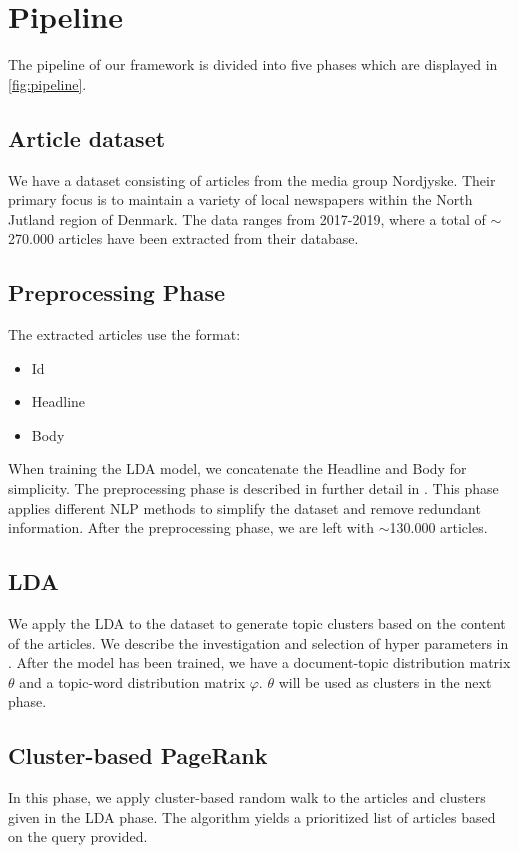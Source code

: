 \section{Pipeline}


The pipeline of our framework is divided into five phases which are displayed in \autoref{fig:pipeline}.

\subsection{Article dataset}
We have a dataset consisting of articles from the media group Nordjyske. Their primary focus is to maintain a variety of local newspapers within the North Jutland region of Denmark. 
The data ranges from 2017-2019, where a total of $\sim$270.000 articles have been extracted from their database.

\subsection{Preprocessing Phase}
The extracted articles use the format:
\begin{itemize}
	\item Id
	\item Headline
	\item Body
\end{itemize}
When training the LDA model, we concatenate the Headline and Body for simplicity.
The preprocessing phase is described in further detail in .
This phase applies different \gls{NLP} methods to simplify the dataset and remove redundant information.
After the preprocessing phase, we are left with $\sim$130.000 articles.

\subsection{LDA}
We apply the \acrfull{LDA} to the dataset to generate topic clusters based on the content of the articles. 
We describe the investigation and selection of hyper parameters in . 
After the model has been trained, we have a document-topic distribution matrix $\theta$ and a topic-word distribution matrix $\varphi$.
$\theta$ will be used as clusters in the next phase.

\subsection{Cluster-based PageRank}
In this phase, we apply cluster-based random walk to the articles and clusters given in the \gls{LDA} phase.
The algorithm yields a prioritized list of articles based on the query provided.


